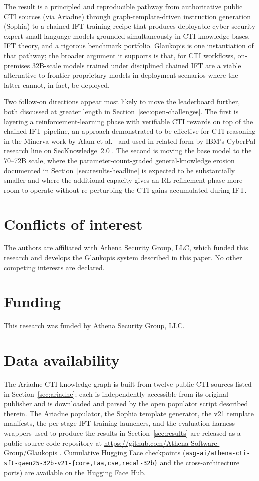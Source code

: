 \documentclass[conference]{IEEEtran}
\providecommand{\hfid}[1]{{\small\nolinkurl{#1}}}
\begin{document}
The result is a principled and reproducible pathway from authoritative public CTI sources (via Ariadne) through graph-template-driven instruction generation (Sophia) to a chained-IFT training recipe that produces deployable cyber security expert small language models grounded simultaneously in CTI knowledge bases, IFT theory, and a rigorous benchmark portfolio. Glaukopis is one instantiation of that pathway; the broader argument it supports is that, for CTI workflows, on-premises 32B-scale models trained under disciplined chained IFT are a viable alternative to frontier proprietary models in deployment scenarios where the latter cannot, in fact, be deployed.

Two follow-on directions appear most likely to move the leaderboard further, both discussed at greater length in Section~\ref{sec:open-challenges}. The first is layering a reinforcement-learning phase with verifiable CTI rewards on top of the chained-IFT pipeline, an approach demonstrated to be effective for CTI reasoning in the Minerva work by Alam et al.\ \cite{alam2026minerva} and used in related form by IBM's CyberPal research line on SecKnowledge~2.0 \cite{levi2025toward}. The second is moving the base model to the 70--72B scale, where the parameter-count-graded general-knowledge erosion documented in Section~\ref{sec:results-headline} is expected to be substantially smaller and where the additional capacity gives an RL refinement phase more room to operate without re-perturbing the CTI gains accumulated during IFT.


\section{Conflicts of interest}
The authors are affiliated with Athena Security Group, LLC, which funded this research and develops the Glaukopis system described in this paper. No other competing interests are declared.

\section{Funding}
This research was funded by Athena Security Group, LLC.

\section{Data availability}
The Ariadne CTI knowledge graph is built from twelve public CTI sources listed in Section~\ref{sec:ariadne}; each is independently accessible from its original publisher and is downloaded and parsed by the open populator script described therein. The Ariadne populator, the Sophia template generator, the v21 template manifests, the per-stage IFT training launchers, and the evaluation-harness wrappers used to produce the results in Section~\ref{sec:results} are released as a public source-code repository at \url{https://github.com/Athena-Software-Group/Glaukopis} \cite{glaukopis2026repo}. Cumulative Hugging Face checkpoints (\hfid{asg-ai/athena-cti-sft-qwen25-32b-v21-\{core,taa,cse,recal-32b\}} and the cross-architecture ports) are available on the Hugging Face Hub.
\end{document}
